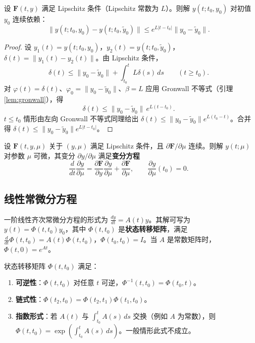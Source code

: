 \begin{proposition}[解对初值的连续依赖性]\label{prop:continuous_dependence}
设 $\mathbf{F}(t, y)$ 满足 Lipschitz 条件（Lipschitz 常数为 $L$）。则解 $y(t; t_0, y_0)$ 对初值 $y_0$ 连续依赖：
\[
\|y(t; t_0, y_0) - y(t; t_0, \tilde{y}_0)\| \le e^{L|t-t_0|} \|y_0 - \tilde{y}_0\|.
\]
\end{proposition}

\begin{proof}
设 $y_1(t) = y(t; t_0, y_0)$，$y_2(t) = y(t; t_0, \tilde{y}_0)$，$\delta(t) = \|y_1(t) - y_2(t)\|$。由 Lipschitz 条件，
\[
\delta(t) \le \|y_0 - \tilde{y}_0\| + \int_{t_0}^t L\delta(s)\,ds \qquad (t \ge t_0).
\]
对 $\varphi(t) = \delta(t)$、$\varphi_0 = \|y_0 - \tilde{y}_0\|$、$\beta = L$ 应用 Gronwall 不等式（引理 \ref{lem:gronwall}），得
\[
\delta(t) \le \|y_0 - \tilde{y}_0\|\, e^{L(t-t_0)}.
\]
$t \le t_0$ 情形由左向 Gronwall 不等式同理给出 $\delta(t) \le \|y_0 - \tilde{y}_0\| e^{L(t_0-t)}$。合并得 $\delta(t) \le \|y_0 - \tilde{y}_0\| e^{L|t-t_0|}$。
\end{proof}

\begin{property}[解对参数的可微依赖性]\label{prop:solution_smooth_dependence}
设 $\mathbf{F}(t, y, \mu)$ 关于 $(y, \mu)$ 满足 Lipschitz 条件，且 $\partial \mathbf{F}/\partial \mu$ 连续。则解 $y(t; \mu)$ 对参数 $\mu$ 可微，其变分 $\partial y/\partial \mu$ 满足\textbf{变分方程}
\[
\frac{d}{dt}\frac{\partial y}{\partial \mu} = \frac{\partial \mathbf{F}}{\partial y}\frac{\partial y}{\partial \mu} + \frac{\partial \mathbf{F}}{\partial \mu}, \qquad \frac{\partial y}{\partial \mu}(t_0) = 0.
\]
\end{property}

\subsection{线性常微分方程}

\begin{definition}[一阶线性齐次系统]\label{def:linear_homogeneous_ode}
一阶线性齐次常微分方程的形式为 $\frac{dy}{dt} = A(t) y$。其解可写为 $y(t) = \Phi(t, t_0) y_0$，其中 $\Phi(t, t_0)$ 是\textbf{状态转移矩阵}，满足 $\frac{d}{dt}\Phi(t, t_0) = A(t)\Phi(t, t_0)$，$\Phi(t_0, t_0) = I$。当 $A$ 是常数矩阵时，$\Phi(t, 0) = e^{At}$。
\end{definition}

\begin{property}[状态转移矩阵的基本性质]\label{prop:stm_properties}
状态转移矩阵 $\Phi(t, t_0)$ 满足：
\begin{enumerate}[label=(\roman*)]
    \item \textbf{可逆性}：$\Phi(t, t_0)$ 对任意 $t$ 可逆，$\Phi^{-1}(t, t_0) = \Phi(t_0, t)$。
    \item \textbf{链式性}：$\Phi(t_2, t_0) = \Phi(t_2, t_1)\Phi(t_1, t_0)$。
    \item \textbf{指数形式}：若 $A(t)$ 与 $\int_{t_0}^t A(s)\,ds$ 交换（例如 $A$ 为常数），则 $\Phi(t, t_0) = \exp\left(\int_{t_0}^t A(s)\,ds\right)$。一般情形此式不成立。
\end{enumerate}
\end{property}

